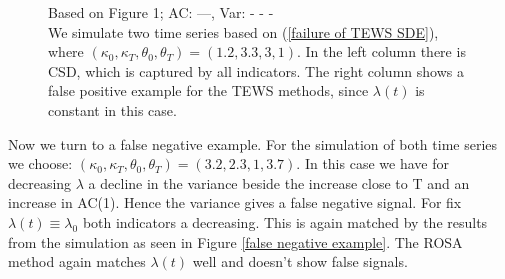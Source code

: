 \documentclass[%
thesis=student,%
coverpage=false,%
titlepage=false,%
headmarks=true, %
english,%
font=libertine, %
math=newpxtx, %
BCOR=5mm,%
coverBCOR=11mm%
]{tumbook}
\begin{document}
\begin{figure}
\begin{minipage}{0.49\textwidth}
    \end{minipage}
    \begin{minipage}{\textwidth}
    \centering
    \caption{Based on \cite{Morr:2024} Figure 1; AC: ---, Var: - - - \\
    We simulate two time series based on (\ref{failure of TEWS SDE}), where $(\kappa_{0},\kappa_{T},\theta_{0},\theta_{T}) = (1.2,3.3,3,1)$. In the left column there is CSD, which is captured by all indicators. The right column shows a false positive example for the TEWS methods, since $\lambda(t)$ is constant in this case. 
    }
    \label{false positive example}
    \end{minipage}
\end{figure}


Now we turn to a false negative example. For the simulation of both time series we choose: $(\kappa_{0},\kappa_{T},\theta_{0},\theta_{T}) = (3.2,2.3,1,3.7)$. In this case we have for decreasing $\lambda$ a decline in the variance beside the increase close to T and an increase in AC(1). Hence the variance gives a false negative signal. For fix $\lambda(t) \equiv \lambda_{0}$ both indicators a decreasing. This is again matched by the results from the simulation as seen in Figure \ref{false negative example}. The ROSA method again matches $\lambda(t)$ well and doesn't show false signals.
\end{document}
